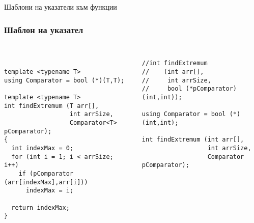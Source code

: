 \documentclass{beamer}
\begin{document}
\begin{frame}
\centerline{Шаблони на указатели към функции}
\end{frame}

\begin{frame}[fragile]
\frametitle{Шаблон на указател}





\begin{columns}[t]
  \begin{column}{0.55\textwidth}
\begin{flushleft}
\begin{lstlisting}


template <typename T>
using Comparator = bool (*)(T,T);

template <typename T>
int findExtremum (T arr[], 
                  int arrSize, 
                  Comparator<T> pComparator);
{
  int indexMax = 0;
  for (int i = 1; i < arrSize; i++)
    if (pComparator (arr[indexMax],arr[i]))
      indexMax = i;

  return indexMax;
}
\end{lstlisting}  
\end{flushleft}
  \end{column}
  \begin{column}{0.45\textwidth}
\begin{flushleft}
\begin{lstlisting}

//int findExtremum 
//    (int arr[], 
//     int arrSize, 
//     bool (*pComparator)(int,int));

using Comparator = bool (*)(int,int);

int findExtremum (int arr[], 
                  int arrSize, 
                  Comparator pComparator);

\end{lstlisting}  
\end{flushleft}
  \end{column}
\end{columns}


  


\end{frame}
\end{document}
